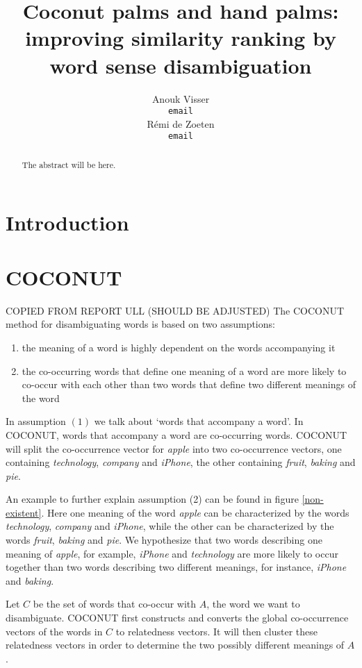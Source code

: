 \documentclass[11pt]{article}
\title{Coconut palms and hand palms: improving similarity ranking by word sense disambiguation}
\author{Anouk Visser \\
  {\tt email} \\\And
  R\'emi de Zoeten \\
  {\tt email} \\}
\date{}
\begin{document}
\maketitle
\begin{abstract}
The abstract will be here.
\end{abstract}

\section{Introduction}

\section{COCONUT}
COPIED FROM REPORT ULL (SHOULD BE ADJUSTED)
The COCONUT method for disambiguating words is based on two assumptions: 
\begin{enumerate}
\item the meaning of a word is highly dependent on the words accompanying it
\item the co-occurring words that define one meaning of a word are more likely to co-occur with each other than two words that define two different meanings of the word
\end{enumerate}
In assumption $(1)$ we talk about `words that accompany a word'. In COCONUT, words that accompany a word are co-occurring words. COCONUT will split the co-occurrence vector for \textit{apple} into two co-occurrence vectors, one containing \textit{technology}, \textit{company} and \textit{iPhone}, the other containing \textit{fruit}, \textit{baking} and \textit{pie}. 

An example to further explain assumption (2) can be found in figure \ref{non-existent}. Here one meaning of the word \textit{apple} can be characterized by the words \textit{technology}, \textit{company} and \textit{iPhone}, while the other can be characterized by the words \textit{fruit}, \textit{baking} and \textit{pie}. We hypothesize that two words describing one meaning of \textit{apple}, for example, \textit{iPhone} and \textit{technology} are more likely to occur together than two words describing two different meanings, for instance, \textit{iPhone} and \textit{baking}.

Let $C$ be the set of words that co-occur with $A$, the word we want to disambiguate. COCONUT first constructs and converts the global co-occurrence vectors of the words in $C$ to relatedness vectors. It will then cluster these relatedness vectors in order to determine the two possibly different meanings of $A$. 
\end{document}
